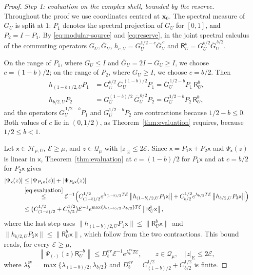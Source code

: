 \documentclass[11pt]{amsart}
\numberwithin{equation}{section}
\theoremstyle{definition}
\newcommand{\Hh}{\mathcal H}
\newcommand{\Res}{\mathsf R}
\newcommand{\sx}{\mathsf x}
\newcommand{\bx}{\mathbf x}
\newcommand{\Energy}{\mathcal E}
\newcommand{\norm}[1]{\left\|#1\right\|}
\begin{document}
\begin{proof}
\emph{Step 1: evaluation on the complex shell, bounded by the reserve.}
Throughout the proof we use coordinates centred at \(\bx_0\). The spectral measure of
\(G_U\) is split at
\(1\): \(P_1\) denotes the spectral projection of \(G_U\) for
\([0,1]\), and \(P_2=I-P_1\). By \eqref{eq:modular-source} and
\eqref{eq:reserve}, in the joint spectral calculus of the commuting
operators \(G_U,\overline G_U\),
\(h_{c,U}=G_U^{1/2-c}\overline G_U^{\,c}\) and
\(\Res_U^b=G_U^{b/2}\overline G_U^{\,b/2}\).

On the range of \(P_1\), where \(G_U\le I\) and
\(\overline G_U=2I-G_U\ge I\), we choose \(c=(1-b)/2\); on the range
of \(P_2\), where \(G_U\ge I\), we choose \(c=b/2\). Then
\begin{align*}
 h_{(1-b)/2,U}P_1
 &=G_U^{b/2}\,\overline G_U^{\,(1-b)/2}P_1
 =\overline G_U^{\,1/2-b}P_1\,\Res_U^b,\\
 h_{b/2,U}P_2
 &=G_U^{(1-b)/2}\,\overline G_U^{\,b/2}P_2
 =G_U^{1/2-b}P_2\,\Res_U^b,
\end{align*}
and the operators \(\overline G_U^{\,1/2-b}P_1\) and
\(G_U^{1/2-b}P_2\) are contractions because \(1/2-b\le0\). Both
values of \(c\) lie in \((0,1/2)\), as Theorem~\ref{thm:evaluation}
requires, because \(1/2\le b<1\).

Let \(\sx\in\Hh_{\mu,U}\), \(\Energy\ge\mu\), and
\(z\in\mathcal Q_\mu\) with \(|z|_{\mathrm E}\le2\Energy\). Since
\(\sx=P_1\sx+P_2\sx\) and \(\Psi_\sx(z)\) is linear in \(\sx\),
Theorem~\ref{thm:evaluation} at \(c=(1-b)/2\) for \(P_1\sx\) and at
\(c=b/2\) for \(P_2\sx\) gives
\begin{align*}
 |\Psi_\sx(z)|
 &\le|\Psi_{P_1\sx}(z)|+|\Psi_{P_2\sx}(z)|\\
 &\overset{\eqref{eq:evaluation}}{\le}
 \Energy^{-1}\Bigl(C_{(1-b)/2}^{1/2}e^{\lambda_{(1-b)/2}T\Energy}
   \norm{h_{(1-b)/2,U}P_1\sx}
   +C_{b/2}^{1/2}e^{\lambda_{b/2}T\Energy}
   \norm{h_{b/2,U}P_2\sx}\Bigr)\\
 &\le\bigl(C_{(1-b)/2}^{1/2}+C_{b/2}^{1/2}\bigr)\Energy^{-1}
   e^{\max\{\lambda_{(1-b)/2},\lambda_{b/2}\}T\Energy}
   \norm{\Res_U^b\sx},
\end{align*}
where the last step uses
\(\lVert h_{(1-b)/2,U}P_1\sx\rVert\le\lVert\Res_U^b\sx\rVert\) and
\(\lVert h_{b/2,U}P_2\sx\rVert\le\lVert\Res_U^b\sx\rVert\), which follow from the
two contractions. This bound reads, for every
\(\Energy\ge\mu\),
\begin{equation}
 \norm{\Psi_{(\cdot)}(z)\Res_U^{-b}}
 \le D_b^{\mathrm{ev}}\Energy^{-1}
       e^{\lambda_b^{\mathrm{ev}}T\Energy},
 \qquad
 z\in\mathcal Q_\mu,\quad |z|_{\mathrm E}\le2\Energy,
 \label{eq:symmetric-evaluation}
\end{equation}
where
\(\lambda_b^{\mathrm{ev}}
=\max\{\lambda_{(1-b)/2},\lambda_{b/2}\}\)
and \(D_b^{\mathrm{ev}}=C_{(1-b)/2}^{1/2}+C_{b/2}^{1/2}\) is finite.


\end{proof}
\end{document}
